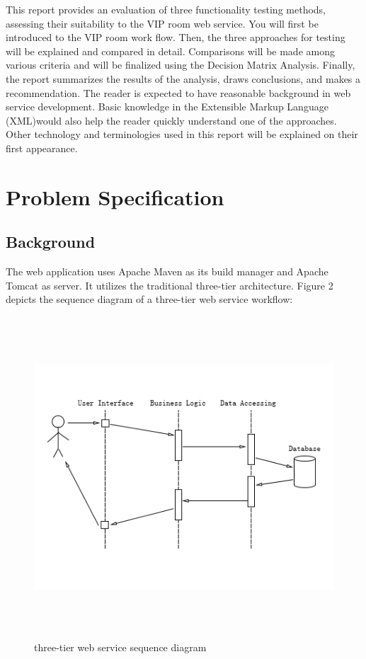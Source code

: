 \documentclass[12pt]{article}
\begin{document}
This report provides an evaluation of three functionality testing methods, assessing their 
suitability to the VIP room web service. You will first be introduced to the VIP room work flow. Then, the three approaches for testing will be explained and compared in detail. Comparisons will be made among various criteria and will be finalized using the Decision Matrix Analysis. Finally, the report summarizes the results of the analysis, draws 
conclusions, and makes a recommendation. The reader is expected to have reasonable background in web service development. Basic knowledge in the Extensible Markup Language (XML)would also help the reader quickly understand one of the approaches. Other technology and terminologies used in this report will be explained on their first appearance.\\



\newpage

\section{Problem Specification}
\subsection{Background}
The web application uses Apache Maven as its build manager and Apache Tomcat as server. It utilizes the traditional three-tier architecture. Figure 2 depicts the sequence diagram of a three-tier web service workflow:

\begin{figure}[ht!]
\centering
\includegraphics[width=12cm,height=12cm,keepaspectratio]{img/three_tier.jpg}
\caption{three-tier web service sequence diagram}
\label{overflow}
\end{figure}
\end{document}
